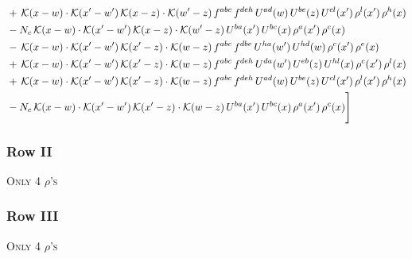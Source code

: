\documentclass[9pt]{article}
\numberwithin{equation}{section}
\begin{document}
\begin{align}
&+\,\mathcal{K}(x-w)\cdot\mathcal{K}(x'-w')\,\mathcal{K}(x-z)\cdot\mathcal{K}(w'-z)\,f^{abc}\,f^{deh}\,U^{ad}(w)\,U^{be}(z)\,U^{cl}(x')\,\rho^{l}(x')\,\rho^{h}(x)\notag\\
&-N_{c}\,\mathcal{K}(x-w)\cdot\mathcal{K}(x'-w')\,\mathcal{K}(x-z)\cdot\mathcal{K}(w'-z)\,U^{ba}(x')\,U^{bc}(x)\,\rho^{a}(x')\,\rho^{c}(x)\notag\\
&-\,\mathcal{K}(x-w)\cdot\mathcal{K}(x'-w')\,\mathcal{K}(x'-z)\cdot\mathcal{K}(w-z)\,f^{abc}\,f^{dbe}\,U^{ha}(w')\,U^{hd}(w)\,\rho^{c}(x')\,\rho^{e}(x)\notag\\
&+\,\mathcal{K}(x-w)\cdot\mathcal{K}(x'-w')\,\mathcal{K}(x'-z)\cdot\mathcal{K}(w-z)\,f^{abc}\,f^{deh}\,U^{da}(w')\,U^{eb}(z)\,U^{hl}(x)\,\rho^{c}(x')\,\rho^{l}(x)\notag\\
&+\,\mathcal{K}(x-w)\cdot\mathcal{K}(x'-w')\,\mathcal{K}(x'-z)\cdot\mathcal{K}(w-z)\,f^{abc}\,f^{deh}\,U^{ad}(w)\,U^{be}(z)\,U^{cl}(x')\,\rho^{l}(x')\,\rho^{h}(x)\notag\\
&-N_{c}\,\mathcal{K}(x-w)\cdot\mathcal{K}(x'-w')\,\mathcal{K}(x'-z)\cdot\mathcal{K}(w-z)\,U^{ba}(x')\,U^{bc}(x)\,\rho^{a}(x')\,\rho^{c}(x)\Bigg]
\end{align}     
\subsubsection{Row II}
\textsc{Only 4 $\rho$'s}
\subsubsection{Row III}
\textsc{Only 4 $\rho$'s}
\end{document}
